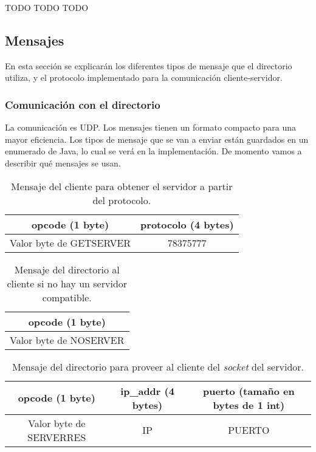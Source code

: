 \documentclass{article}
\begin{document}
TODO TODO TODO

\newpage

\subsection{Mensajes}

En esta sección se explicarán los diferentes tipos de mensaje que el directorio utiliza, y el protocolo implementado para la comunicación cliente-servidor.

\subsubsection{Comunicación con el directorio}

La comunicación es UDP. Los mensajes tienen un formato compacto para una mayor eficiencia. Los tipos de mensaje que se van a enviar están guardados en un enumerado de Java, lo cual se verá en la implementación. De momento vamos a describir qué mensajes se usan.

\begin{table}[h!] \footnotesize
  \begin{tabular}{| c | c |}
  	\hline
      opcode (1 byte) & protocolo (4 bytes) \\
      \hline
      Valor byte de GETSERVER & 78375777 \\
      \hline
  \end{tabular}
  \caption{Mensaje del cliente para obtener el servidor a partir del protocolo.}
\end{table}


\begin{table}[h!]\footnotesize
  \begin{tabular}{| c |}
  	\hline
      opcode (1 byte) \\
      \hline
      Valor byte de NOSERVER \\
      \hline
  \end{tabular}
  \caption{Mensaje del directorio al cliente si no hay un servidor compatible.}
\end{table}

\begin{table}[h!]\footnotesize
  \begin{tabular}{| c | c | c |}
  	\hline
      opcode (1 byte) & ip\_addr (4 bytes) & puerto (tamaño en bytes de 1 int) \\
      \hline
      Valor byte de SERVERRES & IP & PUERTO \\
      \hline
  \end{tabular}
  \caption{Mensaje del directorio para proveer al cliente del \textit{socket} del servidor.}
\end{table}
\end{document}
